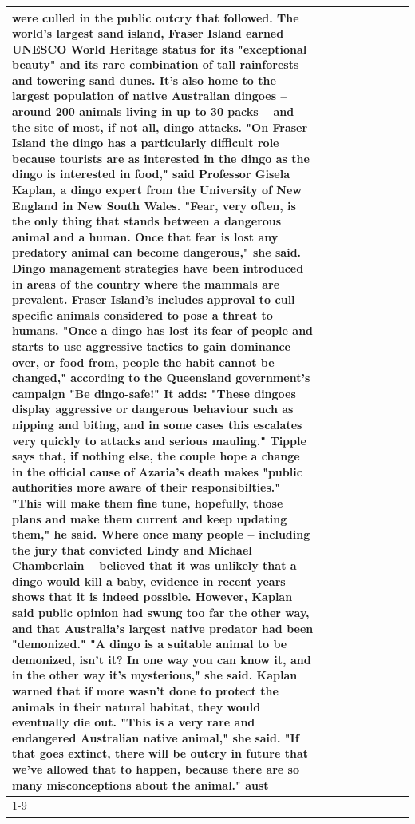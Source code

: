 \begin{table}[H]
\begin{tabular}{lllrlllll}
were culled in the public outcry that followed. The world's largest sand island, Fraser Island earned UNESCO World Heritage status for its "exceptional beauty" and its rare combination of tall rainforests and towering sand dunes. It's also home to the largest population of native Australian dingoes -- around 200 animals living in up to 30 packs -- and the site of most, if not all, dingo attacks. "On Fraser Island the dingo has a particularly difficult role because tourists are as interested in the dingo as the dingo is interested in food," said Professor Gisela Kaplan, a dingo expert from the University of New England in New South Wales. "Fear, very often, is the only thing that stands between a dangerous animal and a human. Once that fear is lost any predatory animal can become dangerous," she said. Dingo management strategies have been introduced in areas of the country where the mammals are prevalent. Fraser Island's includes approval to cull specific animals considered to pose a threat to humans. "Once a dingo has lost its fear of people and starts to use aggressive tactics to gain dominance over, or food from, people the habit cannot be changed," according to the Queensland government's campaign "Be dingo-safe!" It adds: "These dingoes display aggressive or dangerous behaviour such as nipping and biting, and in some cases this escalates very quickly to attacks and serious mauling." Tipple says that, if nothing else, the couple hope a change in the official cause of Azaria's death makes "public authorities more aware of their responsibilties." "This will make them fine tune, hopefully, those plans and make them current and keep updating them," he said. Where once many people -- including the jury that convicted Lindy and Michael Chamberlain -- believed that it was unlikely that a dingo would kill a baby, evidence in recent years shows that it is indeed possible. However, Kaplan said public opinion had swung too far the other way, and that Australia's largest native predator had been "demonized." "A dingo is a suitable animal to be demonized, isn't it? In one way you can know it, and in the other way it's mysterious," she said. Kaplan warned that if more wasn't done to protect the animals in their natural habitat, they would eventually die out. "This is a very rare and endangered Australian native animal," she said. "If that goes extinct, there will be outcry in future that we've allowed that to happen, because there are so many misconceptions about the animal." aust \\
\cline{1-9}

\end{tabular}
\end{table}
